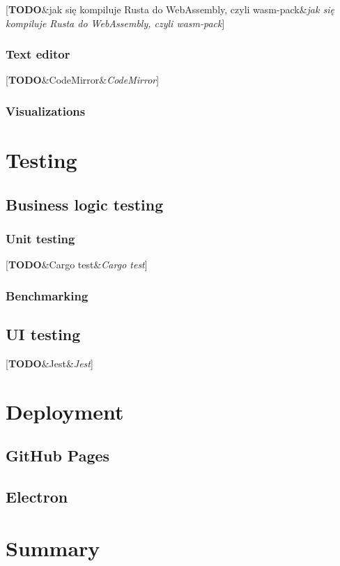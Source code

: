 \documentclass[english,engineering]{wizthesis}
\newcommand{\todo}[1]{%
  {\color{red}[\textbf{TODO}\ifx&#1&{}\else{ }\fi\textit{#1}]}%
}
\begin{document}
\todo{jak się kompiluje Rusta do WebAssembly, czyli wasm-pack}

\subsection{Text editor}

\todo{CodeMirror}

\subsection{Visualizations}

\chapter{Testing}

\section{Business logic testing}

\subsection{Unit testing}

\todo{Cargo test}

\subsection{Benchmarking}

\section{UI testing}

\todo{Jest}

\chapter{Deployment}

\section{GitHub Pages}

\section{Electron}

{\backmatter %
\chapter{Summary}}
\end{document}
